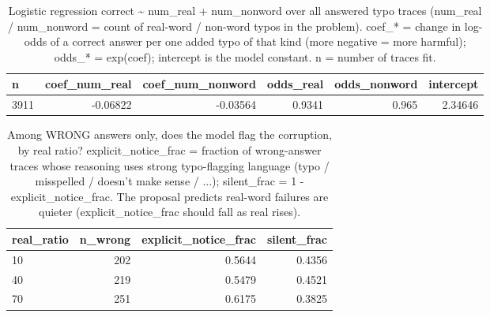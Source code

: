 \documentclass[11pt]{article}
\begin{document}
\begin{table}[H]
\centering
\caption{Logistic regression correct \textasciitilde{} num\_real + num\_nonword over all answered typo traces (num\_real / num\_nonword = count of real-word / non-word typos in the problem). coef\_* = change in log-odds of a correct answer per one added typo of that kind (more negative = more harmful); odds\_* = exp(coef); intercept is the model constant. n = number of traces fit.}
\small
\begin{adjustbox}{max width=\textwidth}
\begin{tabular}{lrrrrr}
\toprule
\textbf{n} & \textbf{coef\_num\_real} & \textbf{coef\_num\_nonword} & \textbf{odds\_real} & \textbf{odds\_nonword} & \textbf{intercept} \\
\midrule
3911 & -0.06822 & -0.03564 & 0.9341 & 0.965 & 2.34646 \\
\bottomrule
\end{tabular}
\end{adjustbox}
\end{table}

\begin{table}[H]
\centering
\caption{Among WRONG answers only, does the model flag the corruption, by real ratio? explicit\_notice\_frac = fraction of wrong-answer traces whose reasoning uses strong typo-flagging language (typo / misspelled / doesn't make sense / ...); silent\_frac = 1 - explicit\_notice\_frac. The proposal predicts real-word failures are quieter (explicit\_notice\_frac should fall as real rises).}
\small
\begin{adjustbox}{max width=\textwidth}
\begin{tabular}{lrrr}
\toprule
\textbf{real\_ratio} & \textbf{n\_wrong} & \textbf{explicit\_notice\_frac} & \textbf{silent\_frac} \\
\midrule
10 & 202 & 0.5644 & 0.4356 \\
40 & 219 & 0.5479 & 0.4521 \\
70 & 251 & 0.6175 & 0.3825 \\
\bottomrule
\end{tabular}
\end{adjustbox}
\end{table}
\end{document}
